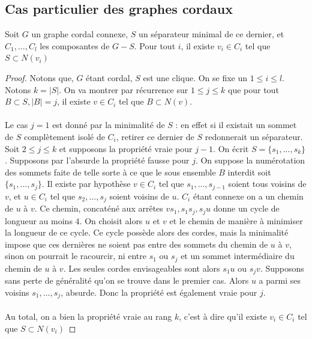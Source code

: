 \documentclass{scrartcl}
\begin{document}
\begin{flushleft}
\subsection{Cas particulier des graphes cordaux}

\begin{lem}
    Soit $G$ un graphe cordal connexe, $S$ un séparateur minimal de ce dernier, et $C_1, ..., C_l$ les composantes de $G - S$. Pour tout
    $i$, il existe $v_i \in C_i$ tel que $S \subset N(v_i)$
\end{lem}

\begin{proof}
    Notons que, $G$ étant cordal, $S$ est une clique. On se fixe un $1 \leq i \leq l$.
    Notons $k = |S|$. On va montrer par récurrence sur $1 \leq j \leq k$ que pour tout $B \subset S, |B| = j$,
    il existe $v \in C_i$ tel que $B \subset N(v)$.
    \\~\\
    Le cas $j = 1$ est donné par la minimalité de $S$ : en effet si il existait un sommet de $S$ complètement isolé de $C_i$, retirer
    ce dernier de $S$ redonnerait un séparateur.\\
    Soit $2 \leq j \leq k$ et supposons la propriété vraie pour $j-1$. On écrit $S = \{s_1, ..., s_k\}$. Supposons par l'absurde la propriété
    fausse pour $j$. On suppose la numérotation des sommets faite de telle sorte à ce que le sous ensemble $B$ interdit soit
    $\{s_1, ..., s_j\}$. Il existe par hypothèse $v \in C_i$ tel que $s_1, ..., s_{j-1}$ soient tous voisins de $v$, et $u \in C_i$ tel que
    $s_2, ..., s_j$ soient voisins de $u$. $C_i$ étant connexe on a un chemin de $u$ à $v$. Ce chemin, concaténé aux arrêtes $vs_1, s_1 s_j, s_j u$
    donne un cycle de longueur au moins $4$. On choisit alors $u$ et $v$ et le chemin de manière à minimiser la longueur de ce cycle.
    Ce cycle possède alors des cordes, mais la minimalité impose que ces dernières ne soient pas entre des sommets du chemin de $u$ à $v$,
    sinon on pourrait le racourcir, ni entre $s_1$ ou $s_j$ et un sommet intermédiaire du chemin de $u$ à $v$. Les seules cordes envisageables
    sont alors $s_1u$ ou $s_jv$. Supposons sans perte de généralité qu'on se trouve dans le premier cas. Alors $u$ a parmi ses voisins
    $s_1, ..., s_j$, absurde. Donc la propriété est également vraie pour $j$.
    \\~\\
    Au total, on a bien la propriété vraie au rang $k$, c'est à dire qu'il existe $v_i \in C_i$ tel que $S \subset N(v_i)$
\end{proof}


\end{flushleft}
\end{document}

